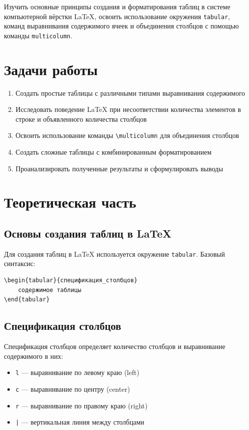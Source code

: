 \documentclass[12pt,a4paper]{article}
\begin{document}
Изучить основные принципы создания и форматирования таблиц в системе компьютерной вёрстки LaTeX, освоить использование окружения \texttt{tabular}, команд выравнивания содержимого ячеек и объединения столбцов с помощью команды \texttt{multicolumn}.

\section{Задачи работы}

\begin{enumerate}
    \item Создать простые таблицы с различными типами выравнивания содержимого
    \item Исследовать поведение LaTeX при несоответствии количества элементов в строке и объявленного количества столбцов
    \item Освоить использование команды \texttt{\textbackslash multicolumn} для объединения столбцов
    \item Создать сложные таблицы с комбинированным форматированием
    \item Проанализировать полученные результаты и сформулировать выводы
\end{enumerate}

\section{Теоретическая часть}

\subsection{Основы создания таблиц в LaTeX}

Для создания таблиц в LaTeX используется окружение \texttt{tabular}. Базовый синтаксис:

\begin{verbatim}
\begin{tabular}{спецификация_столбцов}
    содержимое таблицы
\end{tabular}
\end{verbatim}

\subsection{Спецификация столбцов}

Спецификация столбцов определяет количество столбцов и выравнивание содержимого в них:

\begin{itemize}
    \item \texttt{l} — выравнивание по левому краю (left)
    \item \texttt{c} — выравнивание по центру (center)
    \item \texttt{r} — выравнивание по правому краю (right)
    \item \texttt{|} — вертикальная линия между столбцами
\end{itemize}
\end{document}
